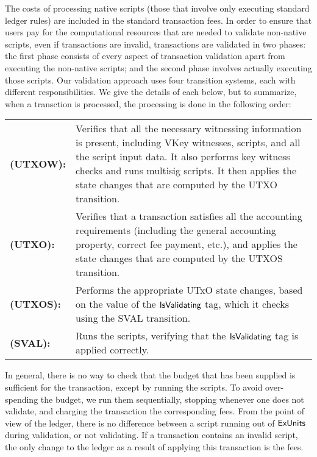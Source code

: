 The costs of processing native scripts (those that involve only executing standard ledger rules) are included in the standard transaction fees.
In order to ensure that users pay for the computational resources that are needed to validate non-native scripts, even
if transactions are invalid, transactions are validated in two phases:
the first phase consists of every aspect of transaction validation apart from executing the non-native scripts; and
the second phase involves actually executing those scripts.
%
Our validation approach  uses four transition systems, each with different responsibilities. We
give the details of each below, but to summarize, when a transction is processed,
the processing is done %
in the following order:


\begin{tabular}{lp{12cm}}
  \textbf{(UTXOW):} & Verifies that all the necessary witnessing information is present, including
  VKey witnesses, scripts, and all the script input data. It also performs
  key witness checks and runs multisig scripts. It then applies the state changes that are
  computed by the UTXO transition.
  \\
  \textbf{(UTXO):} & Verifies that a transaction satisfies all the accounting requirements
  (including the general accounting property, correct fee payment, etc.),
  and applies the state changes that are computed by the UTXOS transition.
  \\
  \textbf{(UTXOS):} & Performs the appropriate UTxO state changes, based on the
  value of the $\mathsf{IsValidating}$ tag, which it checks using the SVAL transition.
  \\
  \textbf{(SVAL):} & Runs the scripts, verifying that the $\mathsf{IsValidating}$ tag
  is applied correctly.
\end{tabular}

In general, there is no way to check that the budget that has been supplied is sufficient for the transaction,
except by running the scripts. To avoid over-spending the budget, we run them sequentially,
stopping whenever one does not validate, and charging the transaction the corresponding
fees. From the point of view of the ledger, there is no difference
between a script running out of $\mathsf{ExUnits}$ during validation, or not validating.
If a transaction contains an invalid script, the only change to the ledger
as a result of applying this transaction is the fees.

